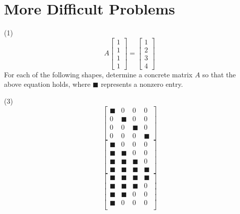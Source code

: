 \section{More Difficult Problems}

\begin{tasks}[resume, style=enumerate](1)
\task
  \begin{displaymath}
    A
    \begin{bmatrix}
      1 \\ 1 \\ 1 \\ 1
    \end{bmatrix}
    =
    \begin{bmatrix}
      1 \\ 2 \\ 3 \\ 4
    \end{bmatrix}
  \end{displaymath}
  For each of the following shapes, determine a concrete matrix $A$ so
  that the above equation holds, where $\blacksquare$ represents a
  nonzero entry.  { \newcommand{\bs}{\blacksquare}
    \begin{tasks}[style=enumerate, counter=shapetask, label=(\alph*)](3)
    \task
      \begin{displaymath}
        \begin{bmatrix}
          \bs&0&0&0 \\ 0&\bs&0&0 \\ 0&0&\bs&0 \\ 0&0&0&\bs
        \end{bmatrix}
      \end{displaymath}
    \task
      \begin{displaymath}
        \begin{bmatrix}
          \bs&0&0&0 \\ \bs&\bs&0&0 \\ \bs&\bs&\bs&0 \\ \bs&\bs&\bs&\bs
        \end{bmatrix}
      \end{displaymath}
    \task
      \begin{displaymath}
        \begin{bmatrix}
          \bs&\bs&\bs&\bs \\ \bs&\bs&\bs&0 \\ \bs&\bs&0&0 \\ \bs&0&0&0
          \\
        \end{bmatrix}

\end{displaymath}
\end{tasks}}
\end{tasks}
